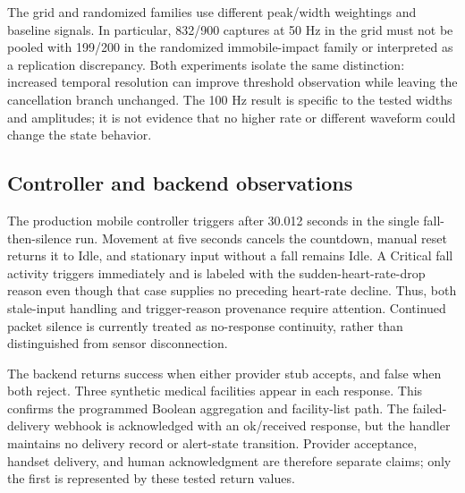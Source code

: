 \documentclass[journal]{IEEEtran}
\begin{document}
The grid and randomized families use different peak/width weightings and baseline signals. In particular, 832/900 captures at 50 Hz in the grid must not be pooled with 199/200 in the randomized immobile-impact family or interpreted as a replication discrepancy. Both experiments isolate the same distinction: increased temporal resolution can improve threshold observation while leaving the cancellation branch unchanged. The 100 Hz result is specific to the tested widths and amplitudes; it is not evidence that no higher rate or different waveform could change the state behavior.

\subsection{Controller and backend observations}
The production mobile controller triggers after 30.012 seconds in the single fall-then-silence run. Movement at five seconds cancels the countdown, manual reset returns it to Idle, and stationary input without a fall remains Idle. A Critical fall activity triggers immediately and is labeled with the sudden-heart-rate-drop reason even though that case supplies no preceding heart-rate decline. Thus, both stale-input handling and trigger-reason provenance require attention. Continued packet silence is currently treated as no-response continuity, rather than distinguished from sensor disconnection.

The backend returns success when either provider stub accepts, and false when both reject. Three synthetic medical facilities appear in each response. This confirms the programmed Boolean aggregation and facility-list path. The failed-delivery webhook is acknowledged with an ok/received response, but the handler maintains no delivery record or alert-state transition. Provider acceptance, handset delivery, and human acknowledgment are therefore separate claims; only the first is represented by these tested return values.
\end{document}
